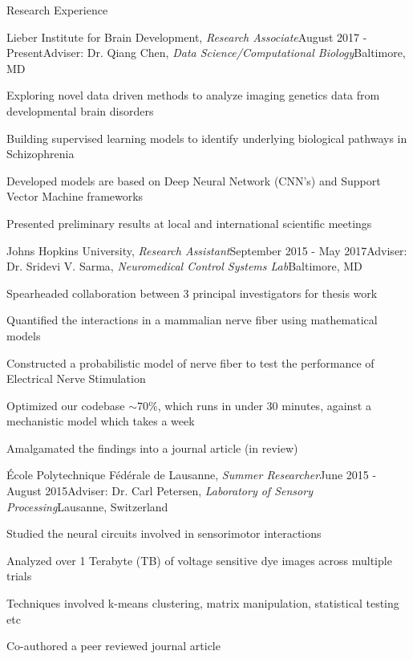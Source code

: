 \documentclass{resume}
\begin{document}
  \vspace{1em}

  \begin{rSection}{Research Experience}
\begin{rSubsection}{Lieber Institute for Brain Development, \textit{Research Associate}}{August 2017 - Present}{Adviser: Dr. Qiang Chen, \textit{Data Science/Computational Biology}}{Baltimore, MD}
\item Exploring novel data driven methods to analyze imaging genetics data from developmental brain disorders
\item Building supervised learning models to identify underlying biological pathways in Schizophrenia
\item Developed models are based on Deep Neural Network (CNN's) and Support Vector Machine frameworks
\item Presented preliminary results at local and international scientific meetings
    \end{rSubsection}

    \begin{rSubsection}{Johns Hopkins University, \textit{Research Assistant}}{September 2015 - May 2017}{Adviser: Dr. Sridevi V. Sarma, \textit{Neuromedical Control Systems Lab}}{Baltimore, MD}
\item Spearheaded collaboration between 3 principal investigators for thesis work
\item Quantified the interactions in a mammalian nerve fiber using mathematical models
\item Constructed a probabilistic model of nerve fiber to test the performance of Electrical Nerve Stimulation
\item Optimized our codebase $\sim$70\%, which runs in under 30 minutes, against a mechanistic model which takes a week
\item Amalgamated the findings into a journal article (in review)
    \end{rSubsection}
  
    \begin{rSubsection}{École Polytechnique Fédérale de Lausanne, \textit{Summer Researcher}}{June 2015 - August 2015}{Adviser: Dr. Carl Petersen, \textit{Laboratory of Sensory Processing}}{Lausanne, Switzerland}
\item Studied the neural circuits involved in sensorimotor interactions
\item Analyzed over 1 Terabyte (TB) of voltage sensitive dye images across multiple trials
\item Techniques involved k-means clustering, matrix manipulation, statistical testing etc
\item Co-authored a peer reviewed journal article
    \end{rSubsection}


\end{rSection}
\end{document}
